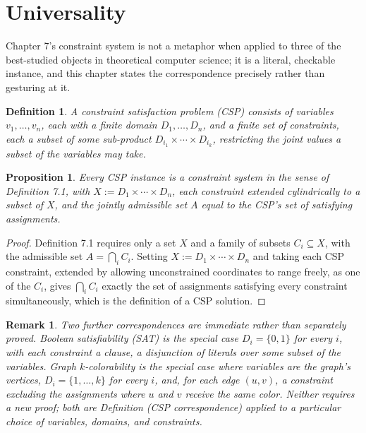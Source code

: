 \documentclass[11pt]{book}
\newtheorem*{appendixdefinition}{Definition}
\newtheorem*{appendixproposition}{Proposition}
\newtheorem*{appendixremark}{Remark}
\begin{document}
\chapter*{Universality}

Chapter 7's constraint system is not a metaphor when applied to three of the best-studied objects in theoretical computer science; it is a literal, checkable instance, and this chapter states the correspondence precisely rather than gesturing at it.

\begin{appendixdefinition}
A \emph{constraint satisfaction problem} (CSP) consists of variables $v_1, \dots, v_n$, each with a finite domain $D_1, \dots, D_n$, and a finite set of constraints, each a subset of some sub-product $D_{i_1} \times \cdots \times D_{i_k}$, restricting the joint values a subset of the variables may take.
\end{appendixdefinition}

\begin{appendixproposition}
Every CSP instance is a constraint system in the sense of Definition 7.1, with $X := D_1 \times \cdots \times D_n$, each constraint extended cylindrically to a subset of $X$, and the jointly admissible set $A$ equal to the CSP's set of satisfying assignments.
\end{appendixproposition}

\begin{proof}
Definition 7.1 requires only a set $X$ and a family of subsets $C_i \subseteq X$, with the admissible set $A = \bigcap_i C_i$. Setting $X := D_1 \times \cdots \times D_n$ and taking each CSP constraint, extended by allowing unconstrained coordinates to range freely, as one of the $C_i$, gives $\bigcap_i C_i$ exactly the set of assignments satisfying every constraint simultaneously, which is the definition of a CSP solution.
\end{proof}

\begin{appendixremark}
Two further correspondences are immediate rather than separately proved. Boolean satisfiability (SAT) is the special case $D_i = \{0,1\}$ for every $i$, with each constraint a clause, a disjunction of literals over some subset of the variables. Graph $k$-colorability is the special case where variables are the graph's vertices, $D_i = \{1, \dots, k\}$ for every $i$, and, for each edge $(u,v)$, a constraint excluding the assignments where $u$ and $v$ receive the same color. Neither requires a new proof; both are Definition (CSP correspondence) applied to a particular choice of variables, domains, and constraints.
\end{appendixremark}
\end{document}
